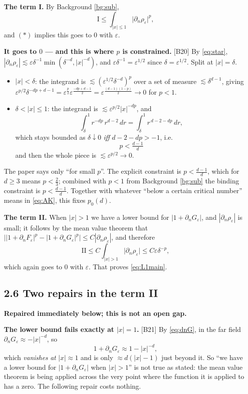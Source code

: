 \documentclass[11pt,reqno]{amsart}
\theoremstyle{plain}
\theoremstyle{definition}
\theoremstyle{plain}
\theoremstyle{definition}
\theoremstyle{remark}
\newcommand{\nd}{\partial_n}
\newcommand{\Ledger}[1]{{\scriptsize\textsf{[#1]}}}
\begin{document}
\noindent\textbf{The term I.} By Background \ref{bg:sub},
\[\mathrm I\le\int_{|x|\le1}\bigl|\nd\rho_\varepsilon\bigr|^p ,\]
and $(*)$ implies this goes to $0$ with $\varepsilon$.

\begin{expansion}
\textbf{It goes to $0$ --- and this is where $p$ is constrained.} \Ledger{B20}
By \eqref{eq:star}, $|\nd\rho_\varepsilon|\lesssim\varepsilon\delta^{-1}
\min(\delta^{-d},|x|^{-d})$, and $\varepsilon\delta^{-1}=\varepsilon^{1/2}$ since
$\delta=\varepsilon^{1/2}$. Split at $|x|=\delta$.
\begin{itemize}[leftmargin=1.4em,itemsep=2pt]
\item $|x|<\delta$: the integrand is
  $\lesssim(\varepsilon^{1/2}\delta^{-d})^p$ over a set of measure
  $\lesssim\delta^{d-1}$, giving
  $\varepsilon^{p/2}\delta^{-dp+d-1}
   =\varepsilon^{\frac p2}\varepsilon^{\frac{-dp+d-1}{2}}
   =\varepsilon^{\frac{(d-1)(1-p)}{2}}\longrightarrow0$ for $p<1$.
\item $\delta<|x|\le1$: the integrand is
  $\lesssim\varepsilon^{p/2}|x|^{-dp}$, and
  \[\int_\delta^1 r^{-dp}\,r^{d-2}\,dr
    =\int_\delta^1 r^{\,d-2-dp}\,dr,\]
  which stays bounded as $\delta\downarrow0$ \emph{iff} $d-2-dp>-1$, i.e.
  \[\boxed{\,p<\tfrac{d-1}{d}\,}\]
  and then the whole piece is $\lesssim\varepsilon^{p/2}\to0$.
\end{itemize}
The paper says only ``for small $p$''. The explicit constraint is
$p<\frac{d-1}d$, which for $d\ge3$ means $p<\frac23$; combined with $p<1$ from
Background \ref{bg:sub} the binding constraint is $p<\frac{d-1}{d}$. Together with
whatever ``below a certain critical number'' means in \eqref{eq:AK}, this fixes
$p_0(d)$.
\end{expansion}

\noindent\textbf{The term II.} When $|x|>1$ we have a lower bound for
$|1+\nd G_\varepsilon|$, and $|\nd\rho_\varepsilon|$ is small; it follows by the
mean value theorem that
$\bigl||1+\nd F_\varepsilon|^p-|1+\nd G_\varepsilon|^p\bigr|
 \le C|\nd\rho_\varepsilon|$, and therefore
\[\mathrm{II}\le C\int_{|x|>1}\bigl|\nd\rho_\varepsilon\bigr|
  \le C\varepsilon\delta^{-p},\]
which again goes to $0$ with $\varepsilon$. That proves \eqref{eq:L1main}.

\subsection*{2.6 Two repairs in the term II}

\begin{caution}
\textbf{Repaired immediately below; this is not an open gap.}\par\smallskip
\textbf{The lower bound fails exactly at $|x|=1$.} \Ledger{B21} By
\eqref{eq:dnG}, in the far field $\nd G_\varepsilon\approx-|x|^{-d}$, so
\[1+\nd G_\varepsilon\approx1-|x|^{-d},\]
which \emph{vanishes at $|x|\approx1$} and is only $\approx d(|x|-1)$ just beyond
it. So ``we have a lower bound for $|1+\nd G_\varepsilon|$ when $|x|>1$'' is not
true as stated: the mean value theorem is being applied across the very point where
the function it is applied to has a zero. The following repair costs nothing.
\end{caution}
\end{document}
